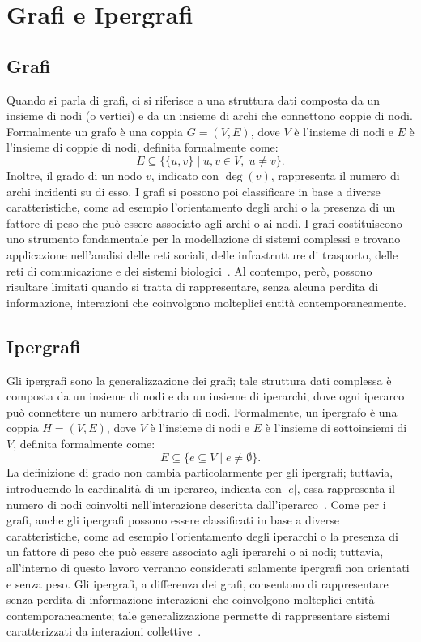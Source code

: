
\section{Grafi e Ipergrafi}\label{sec:grafi_e_ipergrafi}

\subsection{Grafi}

Quando si parla di grafi, ci si riferisce a una struttura dati composta da un insieme di nodi (o vertici) e da un insieme di archi che connettono coppie di nodi.
Formalmente un grafo è una coppia $G = (V, E)$, dove $V$ è l'insieme di nodi e $E$ è l'insieme di coppie di nodi, definita formalmente come:
\[
    E \subseteq \{\{u,v\} \mid u,v \in V,\; u \neq v\}.
\]
Inoltre, il grado di un nodo $v$, indicato con $\deg(v)$, rappresenta il numero di archi incidenti su di esso.
I grafi si possono poi classificare in base a diverse caratteristiche, come ad esempio l'orientamento degli archi o la presenza di un fattore di peso che può essere associato agli archi o ai nodi.
I grafi costituiscono uno strumento fondamentale per la modellazione di sistemi complessi e trovano applicazione nell'analisi delle reti sociali, delle infrastrutture di trasporto, delle reti di comunicazione e dei sistemi biologici~\cite{newman2018}.
Al contempo, però, possono risultare limitati quando si tratta di rappresentare, senza alcuna perdita di informazione, interazioni che coinvolgono molteplici entità contemporaneamente.

\subsection{Ipergrafi}

Gli ipergrafi sono la generalizzazione dei grafi; tale struttura dati complessa è composta da un insieme di nodi e da un insieme di iperarchi, dove ogni iperarco può connettere un numero arbitrario di nodi.
Formalmente, un ipergrafo è una coppia $H = (V, E)$, dove $V$ è l'insieme di nodi e $E$ è l'insieme di sottoinsiemi di $V$, definita formalmente come:
\[
    E \subseteq \{ e \subseteq V \mid e \neq \emptyset \}.
\]
La definizione di grado non cambia particolarmente per gli ipergrafi; tuttavia, introducendo la cardinalità di un iperarco, indicata con $|e|$, essa rappresenta il numero di nodi coinvolti nell'interazione descritta dall'iperarco~\cite{bretto2013}.
Come per i grafi, anche gli ipergrafi possono essere classificati in base a diverse caratteristiche, come ad esempio l'orientamento degli iperarchi o la presenza di un fattore di peso che può essere associato agli iperarchi o ai nodi; tuttavia, all'interno di questo lavoro verranno considerati solamente ipergrafi non orientati e senza peso.
Gli ipergrafi, a differenza dei grafi, consentono di rappresentare senza perdita di informazione interazioni che coinvolgono molteplici entità contemporaneamente; tale generalizzazione permette di rappresentare sistemi caratterizzati da interazioni collettive~\cite{lotito2020}.
